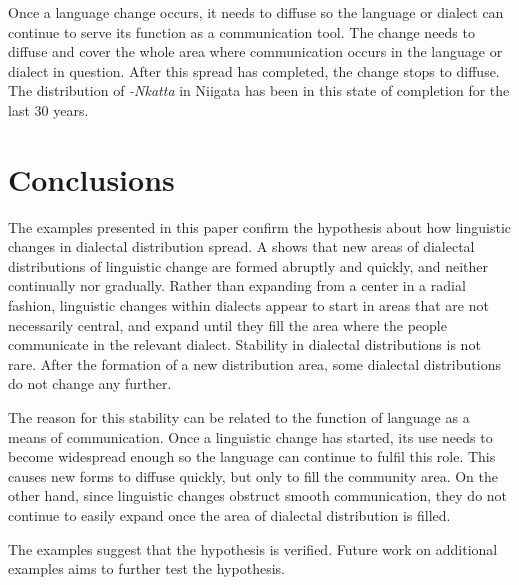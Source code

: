 \documentclass[output=paper]{LSP/langsci}
\begin{document}
\largerpage
Once a language change occurs, it needs to diffuse so the language or dialect can continue to serve its function as a communication tool. The change needs to diffuse and cover the whole area where communication occurs in the language or dialect in question. After this spread has completed, the change stops to diffuse. The distribution of \textit{-Nkatta} in Niigata has been in this state of completion for the last 30 years.



\section{Conclusions}
The examples presented in this paper confirm the hypothesis about how linguistic changes in dialectal distribution spread. A  shows that new areas of dialectal distributions of linguistic change are formed abruptly and quickly, and neither continually nor gradually. Rather than expanding from a center in a radial fashion, linguistic changes within dialects appear to start in areas that are not necessarily central, and expand until they fill the area where the people communicate in the relevant dialect. Stability in dialectal distributions is not rare. After the formation of a new distribution area, some dialectal distributions do not change any further.
 
The reason for this stability can be related to the function of language as a means of communication. Once a linguistic change has started, its use needs to become widespread enough so the language can continue to fulfil this role. This causes new forms to diffuse quickly, but only  to fill the community area. On the other hand, since linguistic changes obstruct smooth communication, they do not continue to easily expand once the area of dialectal distribution is filled.

The examples suggest that the hypothesis is verified. Future work on additional examples aims to further test the hypothesis.

\printbibliography[heading=subbibliography,notkeyword=this]
\end{document}
